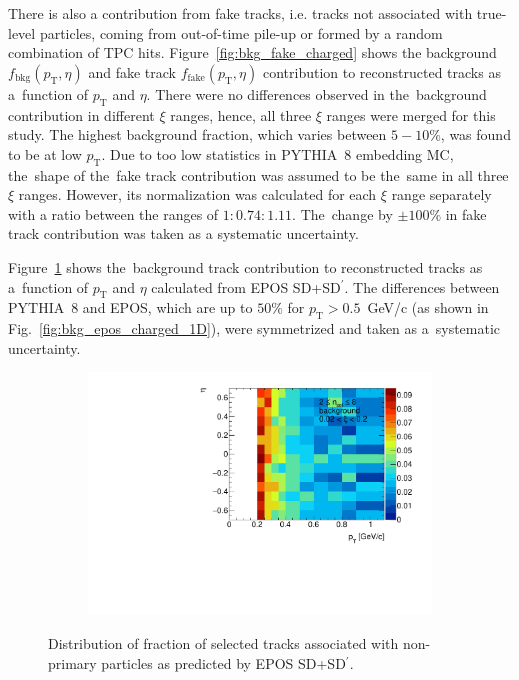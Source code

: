 There is also a contribution from fake tracks, i.e. tracks not associated with true-level particles, coming from out-of-time pile-up or  formed by a random combination of TPC hits. Figure~\ref{fig:bkg_fake_charged} shows the background $f_{\textrm{bkg}}\left(p_{\textrm{T}},\eta\right)$ and fake track $f_{\textrm{fake}}\left(p_{\textrm{T}},\eta\right)$ contribution to reconstructed tracks as a~function of $p_{\textrm{T}}$ and $\eta$. There were no differences observed in the~background contribution in different $\xi$ ranges, hence, all three $\xi$ ranges were merged for this study. The highest background fraction, which varies between $5-10\%$, was found to be at low $p_{\textrm{T}}$.  Due to too low statistics in PYTHIA~8 embedding \ac{MC}, the~shape of the~fake track contribution was assumed to be the~same in all three $\xi$ ranges. However, its normalization was calculated for each $\xi$ range separately with a ratio between the ranges of $1: 0.74: 1.11$.
The~change by $\pm100\%$ in fake track contribution was taken as a systematic uncertainty.


Figure~\ref{fig:bkg_epos_charged} shows the~background track contribution to reconstructed tracks as a~function of $p_\textrm{T}$ and $\eta$ calculated from EPOS SD+SD$^\prime$. The differences between
PYTHIA~8 and EPOS, which are up to $50\%$ for $p_\textrm{T}>0.5$~GeV/c (as shown in Fig.~\ref{fig:bkg_epos_charged_1D}), were symmetrized and taken as a~systematic uncertainty.




\begin{figure}[h!]
	\centering
	\begin{subfigure}{.49\textwidth}
		\includegraphics[width=\linewidth, page=7]{chapters/chrgSTAR/img/chargedBkg/bkg2D.pdf}
	\end{subfigure}
    \begin{minipage}{.49\textwidth}
    	\caption{Distribution of fraction of selected tracks  associated with non-primary particles  as predicted by EPOS SD+SD$^\prime$.}
    	\label{fig:bkg_epos_charged}
    \end{minipage}
	
\end{figure}

